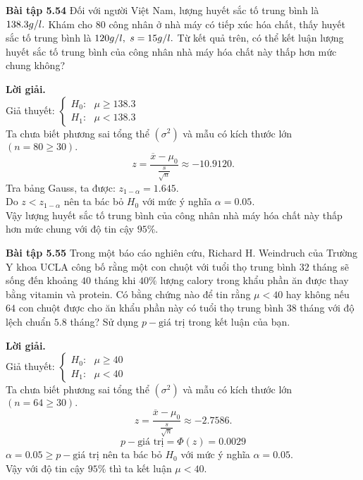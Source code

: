 \begin{mybox}
\textbf{Bài tập 5.54} Đối với người Việt Nam, lượng huyết sắc tố trung bình là $138.3 {g \mathord{\left/
 {\vphantom {g l}} \right.
 \kern-\nulldelimiterspace} l}.$ Khám cho $80$ công nhân ở nhà máy có tiếp xúc hóa chất, thấy huyết sắc tố trung bình là $120 {g \mathord{\left/
 {\vphantom {g l}} \right.
 \kern-\nulldelimiterspace} l},$ $s = 15 {g \mathord{\left/
 {\vphantom {g l}} \right.
 \kern-\nulldelimiterspace} l}.$ Từ kết quả trên, có thể kết luận lượng huyết sắc tố trung bình của công nhân nhà máy hóa chất này thấp hơn mức chung không?
\end{mybox}
\textbf{Lời giải.}\\
Giả thuyết: $\begin{cases}
H_0: \text{ } \mu \geqslant 138.3\\
H_1: \text{ } \mu < 138.3
\end{cases} $ \\
Ta chưa biết phương sai tổng thể $\left( {\sigma^2} \right)$ và mẫu có kích thước lớn $\left( {n = 80 \geqslant 30} \right).$
$$z = \frac{\overline{x} - \mu_0}{\frac{s}{\sqrt{n}}} \approx -10.9120.$$
Tra bảng Gauss, ta được: $z_{1 - \alpha} = 1.645.$\\
Do $z < z_{1 - \alpha}$ nên ta bác bỏ $H_0$ với mức ý nghĩa $\alpha = 0.05.$\\
Vậy lượng huyết sắc tố trung bình của công nhân nhà máy hóa chất này thấp hơn mức chung với độ tin cậy $95\%.$

\begin{mybox}
\textbf{Bài tập 5.55} Trong một báo cáo nghiên cứu, Richard H. Weindruch của Trường Y khoa UCLA công bố rằng một con chuột với tuổi thọ trung bình $32$ tháng sẽ sống đến khoảng $40$ tháng khi $40\%$ lượng calory trong khẩu phần ăn được thay bằng vitamin và protein. Có bằng chứng nào để tin rằng $\mu < 40$ hay không nếu $64$ con chuột được cho ăn khẩu phần này có tuổi thọ trung bình $38$ tháng với độ lệch chuẩn $5.8$ tháng? Sử dụng $p-\text{giá trị}$ trong kết luận của bạn.
\end{mybox}
\textbf{Lời giải.}\\
Giả thuyết: $\begin{cases}
H_0: \text{ } \mu \geqslant 40\\
H_1: \text{ } \mu < 40
\end{cases} $ \\
Ta chưa biết phương sai tổng thể $\left( {\sigma^2} \right)$ và mẫu có kích thước lớn $\left( {n = 64 \geqslant 30} \right).$
$$z = \frac{\overline{x} - \mu_0}{\frac{s}{\sqrt{n}}} \approx -2.7586.$$
$$p-\text{giá trị} = \Phi \left( z \right) = 0.0029$$
$\alpha = 0.05 \geqslant p-\text{giá trị}$ nên ta bác bỏ $H_0$ với mức ý nghĩa $\alpha = 0.05.$\\
Vậy với độ tin cậy $95\%$ thì ta kết luận $\mu < 40.$

